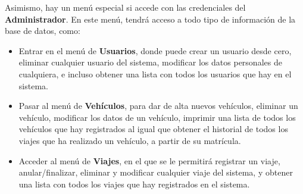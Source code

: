 Asimismo, hay un menú especial si accede con las credenciales del \textbf{Administrador}. En este menú, tendrá acceso a todo tipo de información de la base de datos, como:
\begin{itemize}
  \item Entrar en el menú de \textbf{Usuarios}, donde puede crear un usuario desde cero, eliminar cualquier usuario del sistema, modificar los datos personales de cualquiera,
  e incluso obtener una lista con todos los usuarios que hay en el sistema.
  \item Pasar al menú de \textbf{Vehículos}, para dar de alta nuevos vehículos, eliminar un vehículo, modificar los datos de un vehículo, imprimir una lista de todos los vehículos que hay registrados
  al igual que obtener el historial de todos los viajes que ha realizado un vehículo, a partir de su matrícula.
  \item Acceder al menú de \textbf{Viajes}, en el que se le permitirá registrar un viaje, anular/finalizar, eliminar y modificar cualquier viaje del sistema, y obtener una lista con todos los viajes
  que hay registrados en el sistema.
\end{itemize}